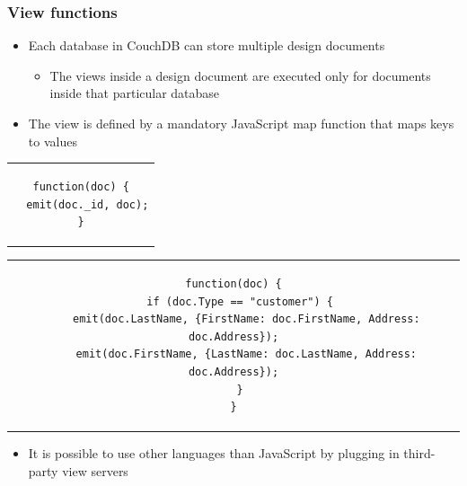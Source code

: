 \documentclass{beamer}
\begin{document}
\begin{frame}[t, fragile]
\frametitle{View functions}
\begin{itemize}
\item Each database in CouchDB can store multiple design documents
\begin{itemize}
	\item The views inside a design document are executed only for documents inside that particular database 
\end{itemize}
\item The view is defined by a mandatory JavaScript map function that maps keys to values
\end{itemize}
{ \tiny
\begin{center}
\begin{tabular}{c}
\begin{lstlisting}
function(doc) {
  emit(doc._id, doc);
}
\end{lstlisting}
\end{tabular}
\end{center}
\begin{center}
\begin{tabular}{c}
\begin{lstlisting}
function(doc) {
  if (doc.Type == "customer") {
    emit(doc.LastName, {FirstName: doc.FirstName, Address: doc.Address});
    emit(doc.FirstName, {LastName: doc.LastName, Address: doc.Address});
  }
}
\end{lstlisting}
\end{tabular}
\end{center}
}
\begin{itemize}

\item It is possible to use other languages than JavaScript by plugging in third-party view servers
\end{itemize}
\end{frame}
\end{document}
